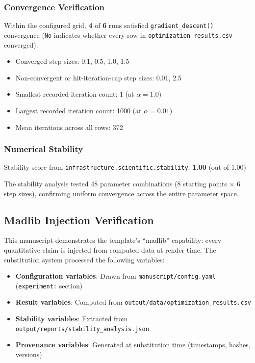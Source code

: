 \documentclass[
]{article}
\providecommand{\tightlist}{%
  \setlength{\itemsep}{0pt}\setlength{\parskip}{0pt}}
\begin{document}
\subsubsection{Convergence Verification}\label{convergence-verification}

Within the configured grid, \textbf{4} of \textbf{6} runs satisfied
\texttt{gradient\_descent()} convergence (\texttt{No} indicates whether
every row in \texttt{optimization\_results.csv} converged).

\begin{itemize}
\tightlist
\item
  Converged step sizes: 0.1, 0.5, 1.0, 1.5
\item
  Non-convergent or hit-iteration-cap step sizes: 0.01, 2.5
\item
  Smallest recorded iteration count: 1 (at \(\alpha = 1.0\))
\item
  Largest recorded iteration count: 1000 (at \(\alpha = 0.01\))
\item
  Mean iterations across all rows: 372
\end{itemize}

\subsubsection{Numerical Stability}\label{numerical-stability}

Stability score from \texttt{infrastructure.scientific.stability}:
\textbf{1.00} (out of 1.00)

The stability analysis tested 48 parameter combinations (8 starting
points \(\times\) 6 step sizes), confirming uniform convergence across
the entire parameter space.

\subsection{Madlib Injection
Verification}\label{madlib-injection-verification}

This manuscript demonstrates the template's ``madlib'' capability: every
quantitative claim is injected from computed data at render time. The
substitution system processed the following variables:

\begin{itemize}
\tightlist
\item
  \textbf{Configuration variables}: Drawn from
  \texttt{manuscript/config.yaml} (\texttt{experiment:} section)
\item
  \textbf{Result variables}: Computed from
  \texttt{output/data/optimization\_results.csv}
\item
  \textbf{Stability variables}: Extracted from
  \texttt{output/reports/stability\_analysis.json}
\item
  \textbf{Provenance variables}: Generated at substitution time
  (timestamps, hashes, versions)
\end{itemize}
\end{document}
